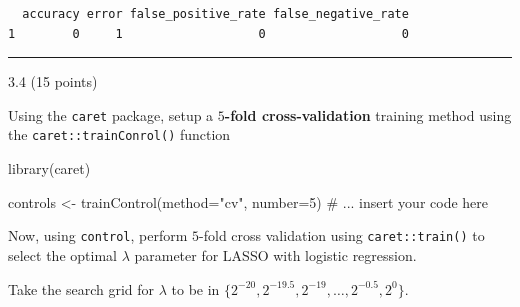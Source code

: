 \documentclass[
  letterpaper,
  DIV=11,
  numbers=noendperiod]{scrartcl}
\newenvironment{Shaded}{\begin{snugshade}}{\end{snugshade}}
\newcommand{\AttributeTok}[1]{\textcolor[rgb]{0.40,0.45,0.13}{#1}}
\newcommand{\CommentTok}[1]{\textcolor[rgb]{0.37,0.37,0.37}{#1}}
\newcommand{\DecValTok}[1]{\textcolor[rgb]{0.68,0.00,0.00}{#1}}
\newcommand{\FloatTok}[1]{\textcolor[rgb]{0.68,0.00,0.00}{#1}}
\newcommand{\FunctionTok}[1]{\textcolor[rgb]{0.28,0.35,0.67}{#1}}
\newcommand{\NormalTok}[1]{\textcolor[rgb]{0.00,0.23,0.31}{#1}}
\newcommand{\OtherTok}[1]{\textcolor[rgb]{0.00,0.23,0.31}{#1}}
\newcommand{\SpecialCharTok}[1]{\textcolor[rgb]{0.37,0.37,0.37}{#1}}
\newcommand{\StringTok}[1]{\textcolor[rgb]{0.13,0.47,0.30}{#1}}
\begin{document}
\begin{verbatim}
  accuracy error false_positive_rate false_negative_rate
1        0     1                   0                   0
\end{verbatim}

\begin{center}\rule{0.5\linewidth}{0.5pt}\end{center}

3.4 (15 points)

Using the \texttt{caret} package, setup a \textbf{\(5\)-fold
cross-validation} training method using the
\texttt{caret::trainConrol()} function

\begin{Shaded}
\begin{Highlighting}[]
\FunctionTok{library}\NormalTok{(caret)}
\end{Highlighting}
\end{Shaded}

\begin{Shaded}
\begin{Highlighting}[]
\NormalTok{controls }\OtherTok{\textless{}{-}} \FunctionTok{trainControl}\NormalTok{(}\AttributeTok{method=}\StringTok{"cv"}\NormalTok{, }\AttributeTok{number=}\DecValTok{5}\NormalTok{) }\CommentTok{\# ... insert your code here}
\end{Highlighting}
\end{Shaded}

Now, using \texttt{control}, perform \(5\)-fold cross validation using
\texttt{caret::train()} to select the optimal \(\lambda\) parameter for
LASSO with logistic regression.

Take the search grid for \(\lambda\) to be in
\(\{ 2^{-20}, 2^{-19.5}, 2^{-19}, \dots, 2^{-0.5}, 2^{0} \}\).

\begin{Shaded}
\end{Shaded}
\end{document}
